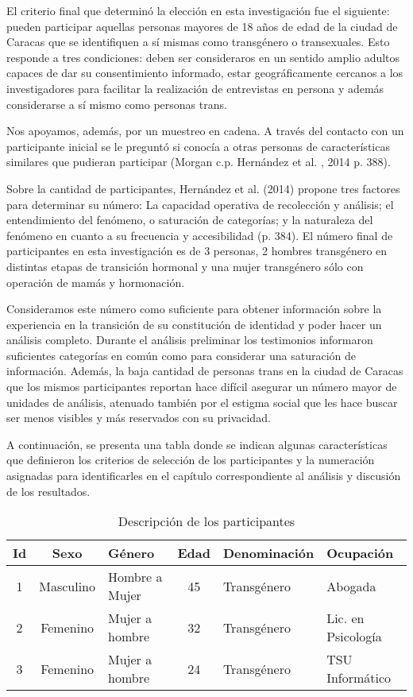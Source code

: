 El criterio final que determinó la elección en esta investigación fue el
siguiente: pueden participar aquellas personas mayores de 18 años de edad de la
ciudad de Caracas que se identifiquen a sí mismas como transgénero o
transexuales.
Esto responde a tres condiciones: deben ser consideraros en un sentido amplio
adultos capaces de dar su consentimiento informado, estar geográficamente
cercanos a los investigadores para facilitar la realización de entrevistas en
persona y además considerarse a sí mismo como personas trans.

Nos apoyamos, además, por un muestreo en cadena.
A través del contacto con un participante inicial se le preguntó si conocía a
otras personas de características similares que pudieran participar (Morgan c.p.
Hernández et  al. , 2014 p. 388).

Sobre la cantidad de participantes, Hernández et al. (2014) propone tres
factores para determinar su número: La capacidad operativa de recolección y
análisis; el entendimiento del fenómeno, o saturación de categorías; y la
naturaleza del fenómeno en cuanto a su frecuencia y accesibilidad (p. 384).
El número final de participantes en esta investigación es de 3 personas, 2
hombres transgénero en distintas etapas de transición hormonal y una mujer
transgénero sólo con operación de mamás y hormonación.

Consideramos este número como suficiente para obtener información sobre la
experiencia en la transición de su constitución de identidad y poder hacer un
análisis completo.
Durante el análisis preliminar los testimonios informaron
suficientes categorías en común como para considerar una saturación de
información.
Además, la baja cantidad de personas trans en la ciudad de Caracas
que los mismos participantes reportan hace difícil asegurar un número mayor de
unidades de análisis, atenuado también por el estigma social que les hace buscar
ser menos visibles y más reservados con su privacidad.

A continuación, se presenta una tabla donde se indican algunas características
que definieron los criterios de selección de los participantes y la numeración
asignadas para identificarles en el capítulo correspondiente al análisis y
discusión de los resultados.

\begin{table}[]
    \caption{Descripción de los participantes}
    \label{tab:participantes}
    \centering
    \renewcommand{\tabcolsep}{1pt}
    \begin{tabularx}{\textwidth}{@{}ccXcXX@{}}
    \toprule
    Id & Sexo & Género         & Edad & Denominación & Ocupación
    \\ \midrule
    1            & Masculino      & Hombre a Mujer & 45   & Transgénero      & Abogada            \\
    2            & Femenino       & Mujer a hombre & 32   & Transgénero      & Lic. en Psicología \\
    3            & Femenino       & Mujer a hombre & 24   & Transgénero      & TSU Informático    \\ \bottomrule
    \end{tabularx}
\end{table}

